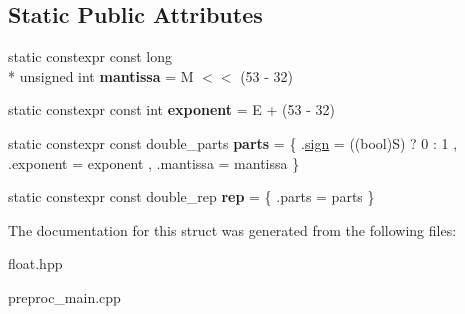 \subsection*{Static Public Attributes}
\begin{DoxyCompactItemize}
\item 
\hypertarget{structtml_1_1impl_1_1to__runtime_3_01tml_1_1floating_1_1number_3_01S_00_01E_00_01M_01_4_01_4_a023275b08a1026950dd04b0ab79901c4}{static constexpr const long \\*
unsigned int {\bfseries mantissa} = M $<$$<$ (53 -\/ 32)}\label{structtml_1_1impl_1_1to__runtime_3_01tml_1_1floating_1_1number_3_01S_00_01E_00_01M_01_4_01_4_a023275b08a1026950dd04b0ab79901c4}

\item 
\hypertarget{structtml_1_1impl_1_1to__runtime_3_01tml_1_1floating_1_1number_3_01S_00_01E_00_01M_01_4_01_4_ae468a544b15904dfb09778467a70d8b4}{static constexpr const int {\bfseries exponent} = E + (53 -\/ 32)}\label{structtml_1_1impl_1_1to__runtime_3_01tml_1_1floating_1_1number_3_01S_00_01E_00_01M_01_4_01_4_ae468a544b15904dfb09778467a70d8b4}

\item 
\hypertarget{structtml_1_1impl_1_1to__runtime_3_01tml_1_1floating_1_1number_3_01S_00_01E_00_01M_01_4_01_4_a37753a472de87c1b4f39e91f0bccdc7d}{static constexpr const double\+\_\+parts {\bfseries parts} = \{ .\hyperlink{structtml_1_1impl_1_1sign}{sign} = ((bool)S) ? 0 \+: 1 , .exponent = exponent , .mantissa = mantissa \}}\label{structtml_1_1impl_1_1to__runtime_3_01tml_1_1floating_1_1number_3_01S_00_01E_00_01M_01_4_01_4_a37753a472de87c1b4f39e91f0bccdc7d}

\item 
\hypertarget{structtml_1_1impl_1_1to__runtime_3_01tml_1_1floating_1_1number_3_01S_00_01E_00_01M_01_4_01_4_a085191ce138abafbe445fb699afc8021}{static constexpr const double\+\_\+rep {\bfseries rep} = \{ .parts = parts \}}\label{structtml_1_1impl_1_1to__runtime_3_01tml_1_1floating_1_1number_3_01S_00_01E_00_01M_01_4_01_4_a085191ce138abafbe445fb699afc8021}

\end{DoxyCompactItemize}


The documentation for this struct was generated from the following files\+:\begin{DoxyCompactItemize}
\item 
float.\+hpp\item 
preproc\+\_\+main.\+cpp\end{DoxyCompactItemize}
